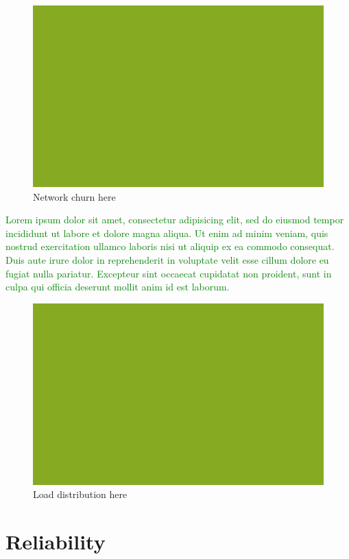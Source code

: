 \documentclass{sig-alternate}
\newcommand{\lorem}               {\textcolor{green}{Lorem ipsum dolor sit amet, consectetur adipisicing elit, sed do eiusmod tempor incididunt ut labore et dolore magna aliqua. Ut enim ad minim veniam, quis nostrud exercitation ullamco laboris nisi ut aliquip ex ea commodo consequat. Duis aute irure dolor in reprehenderit in voluptate velit esse cillum dolore eu fugiat nulla pariatur. Excepteur sint occaecat cupidatat non proident, sunt in culpa qui officia deserunt mollit anim id est laborum.}}
\begin{document}
\begin{figure}
    \centering
    \includegraphics[width=\columnwidth]{fake}
    \caption{Network churn here}
    \label{fig:net_churn}
\end{figure}


\lorem

\begin{figure}
    \centering
    \includegraphics[width=\columnwidth]{fake}
    \caption{Load distribution here}
    \label{fig:net_flows}
\end{figure}

\section{Reliability}
\label{sec:reliability}

\end{document}
